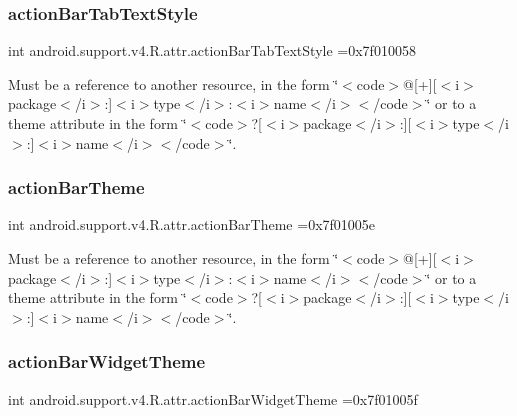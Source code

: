 \subsubsection{\texorpdfstring{action\+Bar\+Tab\+Text\+Style}{actionBarTabTextStyle}}
{\footnotesize\ttfamily int android.\+support.\+v4.\+R.\+attr.\+action\+Bar\+Tab\+Text\+Style =0x7f010058\hspace{0.3cm}{\ttfamily [static]}}

Must be a reference to another resource, in the form \char`\"{}$<$code$>$@\mbox{[}+\mbox{]}\mbox{[}$<$i$>$package$<$/i$>$\+:\mbox{]}$<$i$>$type$<$/i$>$\+:$<$i$>$name$<$/i$>$$<$/code$>$\char`\"{} or to a theme attribute in the form \char`\"{}$<$code$>$?\mbox{[}$<$i$>$package$<$/i$>$\+:\mbox{]}\mbox{[}$<$i$>$type$<$/i$>$\+:\mbox{]}$<$i$>$name$<$/i$>$$<$/code$>$\char`\"{}. \mbox{\label{classandroid_1_1support_1_1v4_1_1R_1_1attr_a7324d49e9fadad73f4d0c0a49f02fbcc}} 
\subsubsection{\texorpdfstring{action\+Bar\+Theme}{actionBarTheme}}
{\footnotesize\ttfamily int android.\+support.\+v4.\+R.\+attr.\+action\+Bar\+Theme =0x7f01005e\hspace{0.3cm}{\ttfamily [static]}}

Must be a reference to another resource, in the form \char`\"{}$<$code$>$@\mbox{[}+\mbox{]}\mbox{[}$<$i$>$package$<$/i$>$\+:\mbox{]}$<$i$>$type$<$/i$>$\+:$<$i$>$name$<$/i$>$$<$/code$>$\char`\"{} or to a theme attribute in the form \char`\"{}$<$code$>$?\mbox{[}$<$i$>$package$<$/i$>$\+:\mbox{]}\mbox{[}$<$i$>$type$<$/i$>$\+:\mbox{]}$<$i$>$name$<$/i$>$$<$/code$>$\char`\"{}. \mbox{\label{classandroid_1_1support_1_1v4_1_1R_1_1attr_ae29f1c530c505df758e34b5892c7ccd1}} 
\subsubsection{\texorpdfstring{action\+Bar\+Widget\+Theme}{actionBarWidgetTheme}}
{\footnotesize\ttfamily int android.\+support.\+v4.\+R.\+attr.\+action\+Bar\+Widget\+Theme =0x7f01005f\hspace{0.3cm}{\ttfamily [static]}}

